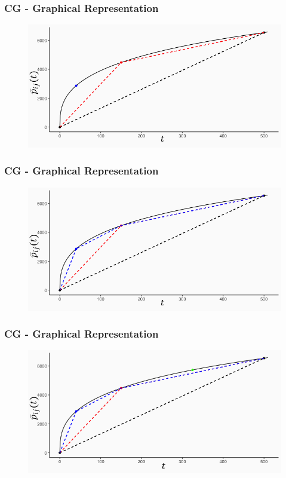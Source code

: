 \begin{frame}
\frametitle{CG - Graphical Representation}
\begin{center}
\begin{figure}
    \centering
    \includegraphics[width=\linewidth]{plot5.png}
\end{figure}
\end{center}
\end{frame}

\begin{frame}
\frametitle{CG - Graphical Representation}
\begin{center}
\begin{figure}
    \centering
    \includegraphics[width=\linewidth]{plot6.png}
\end{figure}
\end{center}
\end{frame}

\begin{frame}
\frametitle{CG - Graphical Representation}
\begin{center}
\begin{figure}
    \centering
    \includegraphics[width=\linewidth]{plot7.png}
\end{figure}
\end{center}
\end{frame}

